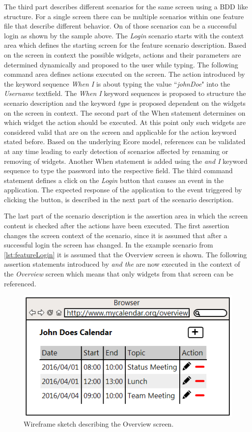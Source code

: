 \documentclass{sig-alternate-05-2015}
\begin{document}
The third part describes different scenarios for the same screen using a BDD like structure.
For a single screen there can be multiple scenarios within one feature file that describe different behavior.
On of those scenarios can be a successful login as shown by the sample above.
The \textit{Login} scenario starts with the context area which defines the starting screen for the feature scenario description. 
Based on the screen in context the possible widgets, actions and their parameters are determined dynamically and proposed to the user while typing.
The following command area defines actions executed on the screen.
The action introduced by the keyword sequence \textit{When I} is about typing the value ``\textit{johnDoe}" into the \textit{Username} textfield. 
The \textit{When I} keyword sequences is proposed to structure the scenario description and the keyword \textit{type} is proposed dependent on the widgets on the screen in context.
The second part of the When statement determines on which widget the action should be executed.
At this point only such widgets are considered valid that are on the screen and applicable for the action keyword stated before.
Based on the underlying Ecore model, references can be validated at any time leading to early detection of scenarios affected by renaming or removing of widgets.
Another When statement is added using the \textit{and I} keyword sequence to type the password into the respective field.
The third command statement defines a click on the \textit{Login} button that causes an event in the application.
The expected response of the application to the event triggered by clicking the button, is described in the next part of the scenario description.

The last part of the scenario description is the assertion area in which the screen content is checked after the actions have been executed.
The first assertion changes the screen context of the scenario, since it is assumed that after a successful login the screen has changed.
In the example scenario from \cref{lst:featureLogin} it is assumed that the Overview screen is shown.
The following assertion statements introduced by \textit{and the} are now executed in the context of the \textit{Overview} screen which means that only widgets from that screen can be referenced.
\begin{figure}[h]
	\centering
	\includegraphics[width=0.8\linewidth]{Overview.png}
	\caption{Wireframe sketch describing the Overview screen.}
	\label{fig:overview}
\end{figure}
\end{document}
